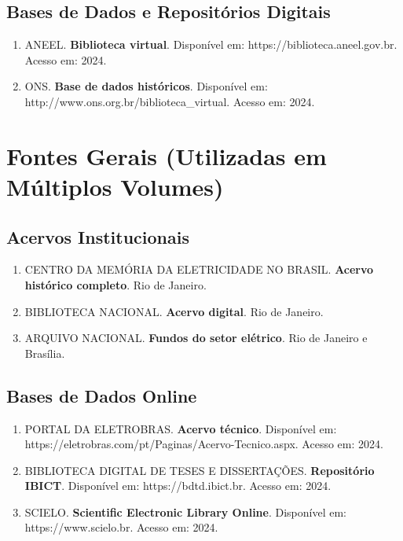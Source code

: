 \documentclass[12pt,a4paper]{report}
\begin{document}
\section*{Bases de Dados e Repositórios Digitais}
\begin{enumerate}[leftmargin=*]
    \item ANEEL. \textbf{Biblioteca virtual}. Disponível em: https://biblioteca.aneel.gov.br. Acesso em: 2024.
    
    \item ONS. \textbf{Base de dados históricos}. Disponível em: http://www.ons.org.br/biblioteca\_virtual. Acesso em: 2024.
\end{enumerate}

\chapter*{Fontes Gerais (Utilizadas em Múltiplos Volumes)}

\section*{Acervos Institucionais}
\begin{enumerate}[leftmargin=*]
    \item CENTRO DA MEMÓRIA DA ELETRICIDADE NO BRASIL. \textbf{Acervo histórico completo}. Rio de Janeiro.
    
    \item BIBLIOTECA NACIONAL. \textbf{Acervo digital}. Rio de Janeiro.
    
    \item ARQUIVO NACIONAL. \textbf{Fundos do setor elétrico}. Rio de Janeiro e Brasília.
\end{enumerate}

\section*{Bases de Dados Online}
\begin{enumerate}[leftmargin=*]
    \item PORTAL DA ELETROBRAS. \textbf{Acervo técnico}. Disponível em: https://eletrobras.com/pt/Paginas/Acervo-Tecnico.aspx. Acesso em: 2024.
    
    \item BIBLIOTECA DIGITAL DE TESES E DISSERTAÇÕES. \textbf{Repositório IBICT}. Disponível em: https://bdtd.ibict.br. Acesso em: 2024.
    
    \item SCIELO. \textbf{Scientific Electronic Library Online}. Disponível em: https://www.scielo.br. Acesso em: 2024.
\end{enumerate}
\end{document}
